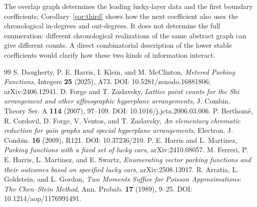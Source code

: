 \documentclass[11pt,a4paper]{article}
\begin{document}
The overlap graph determines the leading lucky-layer data and the first boundary coefficients; Corollary~\ref{cor:third} shows how the next coefficient also uses the chronological in-degrees and out-degrees. It does not determine the full enumeration: different chronological realizations of the same abstract graph can give different counts. A direct combinatorial description of the lower stable coefficients would clarify how these two kinds of information interact.

\begingroup
\small
\setlength{\parskip}{0pt}
\begin{thebibliography}{99}
 S. Daugherty, P. E. Harris, I. Klein, and M. McClinton, \emph{Metered Parking Functions}, Integers \textbf{25} (2025), A73. DOI: 10.5281/zenodo.16881806; arXiv:2406.12941.
 D. Forge and T. Zaslavsky, \emph{Lattice point counts for the Shi arrangement and other affinographic hyperplane arrangements}, J. Combin. Theory Ser. A \textbf{114} (2007), 97--109. DOI: 10.1016/j.jcta.2006.03.006.
 P. Berthom\'e, R. Cordovil, D. Forge, V. Ventos, and T. Zaslavsky, \emph{An elementary chromatic reduction for gain graphs and special hyperplane arrangements}, Electron. J. Combin. \textbf{16} (2009), R121. DOI: 10.37236/210.
 P. E. Harris and L. Martinez, \emph{Parking functions with a fixed set of lucky cars}, arXiv:2410.08057.
 M. Ferreri, P. E. Harris, L. Martinez, and E. Swartz, \emph{Enumerating vector parking functions and their outcomes based on specified lucky cars}, arXiv:2508.13917.
 R. Arratia, L. Goldstein, and L. Gordon, \emph{Two Moments Suffice for Poisson Approximations: The Chen--Stein Method}, Ann. Probab. \textbf{17} (1989), 9--25. DOI: 10.1214/aop/1176991491.
\end{thebibliography}
\endgroup
\end{document}
